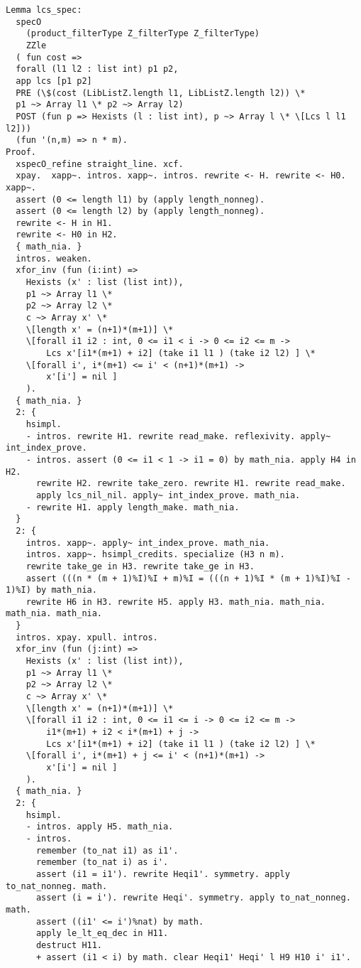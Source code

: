 \begin{verbatim}
Lemma lcs_spec:
  specO
    (product_filterType Z_filterType Z_filterType)
    ZZle
  ( fun cost =>
  forall (l1 l2 : list int) p1 p2,
  app lcs [p1 p2]
  PRE (\$(cost (LibListZ.length l1, LibListZ.length l2)) \*
  p1 ~> Array l1 \* p2 ~> Array l2)
  POST (fun p => Hexists (l : list int), p ~> Array l \* \[Lcs l l1 l2]))
  (fun '(n,m) => n * m).
Proof.
  xspecO_refine straight_line. xcf. 
  xpay.  xapp~. intros. xapp~. intros. rewrite <- H. rewrite <- H0. xapp~. 
  assert (0 <= length l1) by (apply length_nonneg). 
  assert (0 <= length l2) by (apply length_nonneg). 
  rewrite <- H in H1. 
  rewrite <- H0 in H2. 
  { math_nia. }
  intros. weaken. 
  xfor_inv (fun (i:int) => 
    Hexists (x' : list (list int)),
    p1 ~> Array l1 \*
    p2 ~> Array l2 \*
    c ~> Array x' \*
    \[length x' = (n+1)*(m+1)] \*
    \[forall i1 i2 : int, 0 <= i1 < i -> 0 <= i2 <= m -> 
        Lcs x'[i1*(m+1) + i2] (take i1 l1 ) (take i2 l2) ] \* 
    \[forall i', i*(m+1) <= i' < (n+1)*(m+1) ->
        x'[i'] = nil ]
    ). 
  { math_nia. }
  2: {
    hsimpl.
    - intros. rewrite H1. rewrite read_make. reflexivity. apply~ int_index_prove. 
    - intros. assert (0 <= i1 < 1 -> i1 = 0) by math_nia. apply H4 in H2. 
      rewrite H2. rewrite take_zero. rewrite H1. rewrite read_make. 
      apply lcs_nil_nil. apply~ int_index_prove. math_nia. 
    - rewrite H1. apply length_make. math_nia. 
  }
  2: {
    intros. xapp~. apply~ int_index_prove. math_nia. 
    intros. xapp~. hsimpl_credits. specialize (H3 n m). 
    rewrite take_ge in H3. rewrite take_ge in H3. 
    assert (((n * (m + 1)%I)%I + m)%I = (((n + 1)%I * (m + 1)%I)%I - 1)%I) by math_nia. 
    rewrite H6 in H3. rewrite H5. apply H3. math_nia. math_nia. math_nia. math_nia. 
  }
  intros. xpay. xpull. intros. 
  xfor_inv (fun (j:int) => 
    Hexists (x' : list (list int)),
    p1 ~> Array l1 \*
    p2 ~> Array l2 \*
    c ~> Array x' \*
    \[length x' = (n+1)*(m+1)] \*
    \[forall i1 i2 : int, 0 <= i1 <= i -> 0 <= i2 <= m -> 
        i1*(m+1) + i2 < i*(m+1) + j -> 
        Lcs x'[i1*(m+1) + i2] (take i1 l1 ) (take i2 l2) ] \*
    \[forall i', i*(m+1) + j <= i' < (n+1)*(m+1) ->
        x'[i'] = nil ]
    ). 
  { math_nia. }
  2: {
    hsimpl. 
    - intros. apply H5. math_nia. 
    - intros. 
      remember (to_nat i1) as i1'. 
      remember (to_nat i) as i'. 
      assert (i1 = i1'). rewrite Heqi1'. symmetry. apply to_nat_nonneg. math. 
      assert (i = i'). rewrite Heqi'. symmetry. apply to_nat_nonneg. math. 
      assert ((i1' <= i')%nat) by math. 
      apply le_lt_eq_dec in H11. 
      destruct H11.
      + assert (i1 < i) by math. clear Heqi1' Heqi' l H9 H10 i' i1'. 

\end{verbatim}
